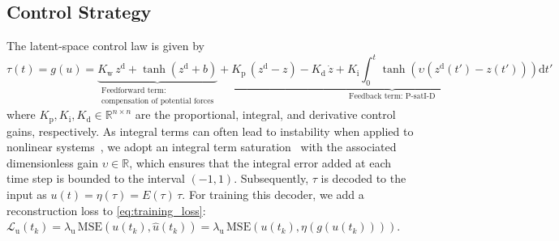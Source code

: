 \subsection{Control Strategy}
The latent-space control law is given by
\begin{equation}\label{eq:con:controller}
    \tau(t) = g(u) = \underbrace{K_\mathrm{w} \, z^\mathrm{d} + \tanh(z^\mathrm{d} + b)}_{\substack{\text{Feedforward term:}\\ \text{compensation of potential forces}}} + \underbrace{K_\mathrm{p} \, (z^\mathrm{d} - z) - K_\mathrm{d} \, \dot{z} + K_\mathrm{i} \int_0^t \tanh(\upsilon (z^\mathrm{d}(t') - z(t')))\mathrm{d}t'}_{\text{Feedback term: P-satI-D}}
\end{equation}
where $K_\mathrm{p}, K_\mathrm{i}, K_\mathrm{d} \in \mathbb{R}^{n \times n}$ are the proportional, integral, and derivative control gains, respectively.
As integral terms can often lead to instability when applied to nonlinear systems~\citep{stolzle2024experimental}, we adopt an integral term saturation~\citep{pustina2022p} with the associated dimensionless gain $\upsilon \in \mathbb{R}$, which ensures that the integral error added at each time step is bounded to the interval $(-1, 1)$.
% 
Subsequently, $\tau$ is  decoded to the input as $u(t) = \eta(\tau) = E(\tau) \, \tau$.
For training this decoder, we add a reconstruction loss to \eqref{eq:training_loss}: $\mathcal{L}_{\mathrm{u}}(t_k) = \lambda_{\mathrm{u}} \, \mathrm{MSE}(u(t_k), \hat{u}(t_k)) = \lambda_{\mathrm{u}} \, \mathrm{MSE} \left (u(t_k), \eta(g(u(t_k))) \right )$.

